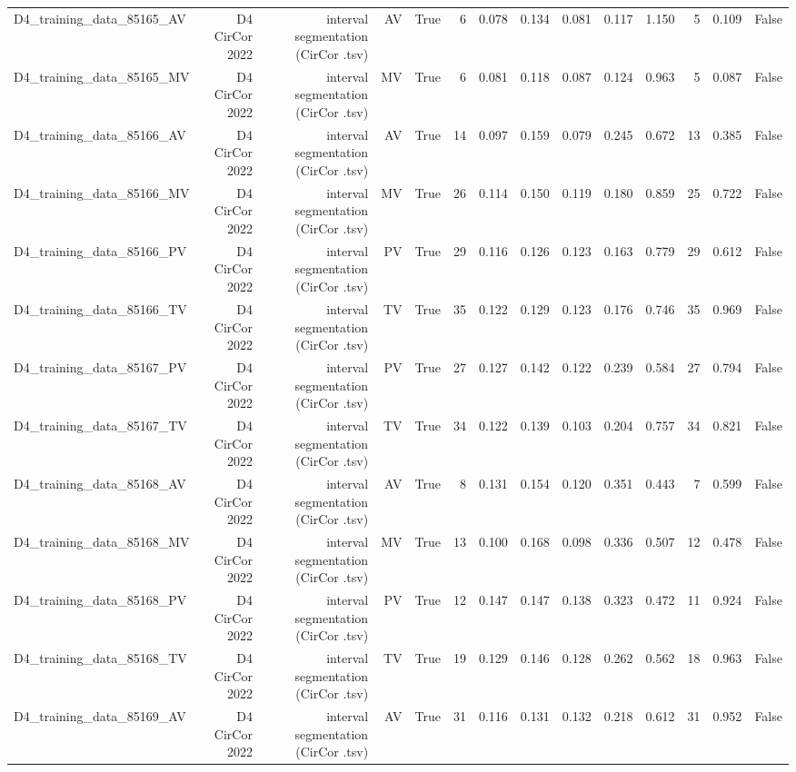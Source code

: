 \begin{table}[htbp]
\begin{tabular}{lrrrrrrrrrrrrr}
    D4\_training\_data\_85165\_AV & D4 CirCor 2022 & interval segmentation (CirCor .tsv) & AV & True & 6 & 0.078 & 0.134 & 0.081 & 0.117 & 1.150 & 5 & 0.109 & False \\
    D4\_training\_data\_85165\_MV & D4 CirCor 2022 & interval segmentation (CirCor .tsv) & MV & True & 6 & 0.081 & 0.118 & 0.087 & 0.124 & 0.963 & 5 & 0.087 & False \\
    D4\_training\_data\_85166\_AV & D4 CirCor 2022 & interval segmentation (CirCor .tsv) & AV & True & 14 & 0.097 & 0.159 & 0.079 & 0.245 & 0.672 & 13 & 0.385 & False \\
    D4\_training\_data\_85166\_MV & D4 CirCor 2022 & interval segmentation (CirCor .tsv) & MV & True & 26 & 0.114 & 0.150 & 0.119 & 0.180 & 0.859 & 25 & 0.722 & False \\
    D4\_training\_data\_85166\_PV & D4 CirCor 2022 & interval segmentation (CirCor .tsv) & PV & True & 29 & 0.116 & 0.126 & 0.123 & 0.163 & 0.779 & 29 & 0.612 & False \\
    D4\_training\_data\_85166\_TV & D4 CirCor 2022 & interval segmentation (CirCor .tsv) & TV & True & 35 & 0.122 & 0.129 & 0.123 & 0.176 & 0.746 & 35 & 0.969 & False \\
    D4\_training\_data\_85167\_PV & D4 CirCor 2022 & interval segmentation (CirCor .tsv) & PV & True & 27 & 0.127 & 0.142 & 0.122 & 0.239 & 0.584 & 27 & 0.794 & False \\
    D4\_training\_data\_85167\_TV & D4 CirCor 2022 & interval segmentation (CirCor .tsv) & TV & True & 34 & 0.122 & 0.139 & 0.103 & 0.204 & 0.757 & 34 & 0.821 & False \\
    D4\_training\_data\_85168\_AV & D4 CirCor 2022 & interval segmentation (CirCor .tsv) & AV & True & 8 & 0.131 & 0.154 & 0.120 & 0.351 & 0.443 & 7 & 0.599 & False \\
    D4\_training\_data\_85168\_MV & D4 CirCor 2022 & interval segmentation (CirCor .tsv) & MV & True & 13 & 0.100 & 0.168 & 0.098 & 0.336 & 0.507 & 12 & 0.478 & False \\
    D4\_training\_data\_85168\_PV & D4 CirCor 2022 & interval segmentation (CirCor .tsv) & PV & True & 12 & 0.147 & 0.147 & 0.138 & 0.323 & 0.472 & 11 & 0.924 & False \\
    D4\_training\_data\_85168\_TV & D4 CirCor 2022 & interval segmentation (CirCor .tsv) & TV & True & 19 & 0.129 & 0.146 & 0.128 & 0.262 & 0.562 & 18 & 0.963 & False \\
    D4\_training\_data\_85169\_AV & D4 CirCor 2022 & interval segmentation (CirCor .tsv) & AV & True & 31 & 0.116 & 0.131 & 0.132 & 0.218 & 0.612 & 31 & 0.952 & False \\

\end{tabular}
\end{table}
